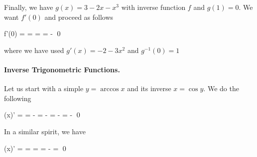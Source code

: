 Finally, we have $g(x) = 3-2x-x^3$ with inverse function $f$ and $g(1) = 0$. We want $f'(0)$ and proceed as follows

\bee
f'(0) =  =  =  = -  \qed
\eee

where we have used $g'(x) = -2 - 3x^2$ and $g^{-1}(0) = 1$

\paragraph{Inverse Trigonometric Functions.} Let us start with a simple $y = \arccos x$ and its inverse $x = \cos y$. We do the following

\bee
(\arccos x)' =  = -  = -  = -  = -  \qed
\eee

In a similar spirit, we have

\bee
(\arcsin x)' =  =  =  = -  =  \qed
\eee
